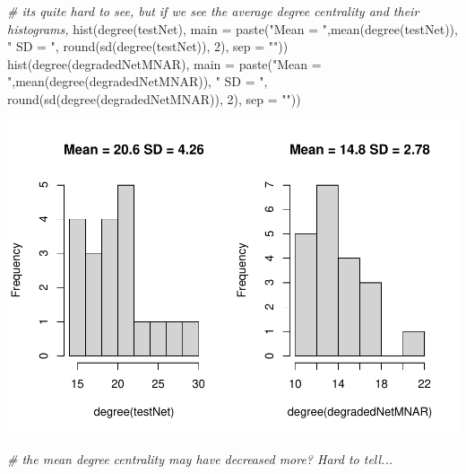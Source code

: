 \documentclass[
]{article}
\newenvironment{Shaded}{\begin{snugshade}}{\end{snugshade}}
\newcommand{\AttributeTok}[1]{\textcolor[rgb]{0.77,0.63,0.00}{#1}}
\newcommand{\CommentTok}[1]{\textcolor[rgb]{0.56,0.35,0.01}{\textit{#1}}}
\newcommand{\DecValTok}[1]{\textcolor[rgb]{0.00,0.00,0.81}{#1}}
\newcommand{\FunctionTok}[1]{\textcolor[rgb]{0.00,0.00,0.00}{#1}}
\newcommand{\NormalTok}[1]{#1}
\newcommand{\StringTok}[1]{\textcolor[rgb]{0.31,0.60,0.02}{#1}}
\begin{document}
\begin{Shaded}
\begin{Highlighting}[]
\CommentTok{\# it\textquotesingle{}s quite hard to see, but if we see the average degree centrality and their histograms,}
\FunctionTok{hist}\NormalTok{(}\FunctionTok{degree}\NormalTok{(testNet), }\AttributeTok{main =} \FunctionTok{paste}\NormalTok{(}\StringTok{"Mean = "}\NormalTok{,}\FunctionTok{mean}\NormalTok{(}\FunctionTok{degree}\NormalTok{(testNet)), }\StringTok{" SD = "}\NormalTok{, }\FunctionTok{round}\NormalTok{(}\FunctionTok{sd}\NormalTok{(}\FunctionTok{degree}\NormalTok{(testNet)), }\DecValTok{2}\NormalTok{), }\AttributeTok{sep =} \StringTok{""}\NormalTok{))}
\FunctionTok{hist}\NormalTok{(}\FunctionTok{degree}\NormalTok{(degradedNetMNAR), }\AttributeTok{main =} \FunctionTok{paste}\NormalTok{(}\StringTok{"Mean = "}\NormalTok{,}\FunctionTok{mean}\NormalTok{(}\FunctionTok{degree}\NormalTok{(degradedNetMNAR)), }\StringTok{" SD = "}\NormalTok{, }\FunctionTok{round}\NormalTok{(}\FunctionTok{sd}\NormalTok{(}\FunctionTok{degree}\NormalTok{(degradedNetMNAR)), }\DecValTok{2}\NormalTok{), }\AttributeTok{sep =} \StringTok{""}\NormalTok{))}
\end{Highlighting}
\end{Shaded}

\includegraphics{20220404_miss_data_model_files/figure-latex/MNAR netdegrade-2.pdf}

\begin{Shaded}
\begin{Highlighting}[]
\CommentTok{\# the mean degree centrality may have decreased more? Hard to tell...}
\end{Highlighting}
\end{Shaded}
\end{document}
